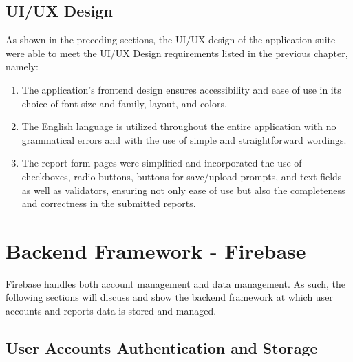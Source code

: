 \subsection{UI/UX Design}

As shown in the preceding sections, the UI/UX design of the application suite were able to meet the UI/UX Design requirements listed in the previous chapter, namely:

\begin{enumerate}
    \item The application's frontend design ensures accessibility and ease of use in its choice of font size and family, layout, and colors.
    \item The English language is utilized throughout the entire application with no grammatical errors and with the use of simple and straightforward wordings.
    \item The report form pages were simplified and incorporated the use of checkboxes, radio buttons, buttons for save/upload prompts, and text fields as well as validators, ensuring not only ease of use but also the completeness and correctness in the submitted reports. 
\end{enumerate}

\section{Backend Framework - Firebase}

Firebase handles both account management and data management. As such, the following sections will discuss and show the backend framework at which user accounts and reports data is stored and managed.

\subsection{User Accounts Authentication and Storage}

